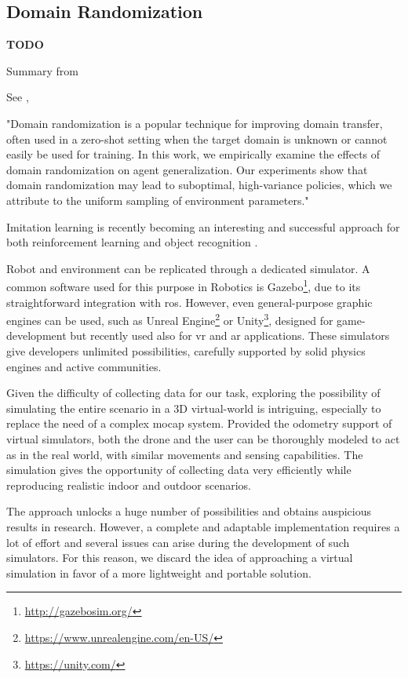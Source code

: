 \subsection{Domain Randomization}
\label{subsec:domain-randomization}

\textbf{TODO}

Summary from \cite{mehta2019active}

See \cite{weng2019DR_explanation}, \cite{tobin2017domain}
 
"Domain randomization is a popular technique for improving domain transfer, often used in a zero-shot setting when the target domain is unknown or cannot easily be used for training. In this work, we empirically examine the effects of domain randomization on agent generalization. Our experiments show that domain randomization may lead to suboptimal, high-variance policies, which we attribute to the uniform sampling of environment parameters."

\medskip

Imitation learning is recently becoming an interesting and successful approach for both reinforcement learning \cite{imitation_learning_3d_navigation} and object recognition \cite{tobin2017domain} \cite{weng2019DR}.

Robot and environment can be replicated through a dedicated simulator. A common software used for this purpose in Robotics is  Gazebo\footnote{\url{http://gazebosim.org/}}, due to its straightforward integration with \gls{ros}. However, even general-purpose graphic engines can be used, such as Unreal Engine\footnote{\url{https://www.unrealengine.com/en-US/}} or Unity\footnote{\url{https://unity.com/}}, designed for game-development but recently used also for \gls{vr} and \gls{ar} applications. These simulators give developers unlimited possibilities, carefully supported by solid physics engines and active communities.

\medskip

Given the difficulty of collecting data for our task, exploring the possibility of simulating the entire scenario in a 3D virtual-world is intriguing, especially to replace the need of a complex \gls{mocap} system. Provided the odometry support of virtual simulators, both the drone and the user can be thoroughly modeled to act as in the real world, with similar movements and sensing capabilities. The simulation gives the opportunity of collecting data very efficiently while reproducing realistic indoor and outdoor scenarios.

The approach unlocks a huge number of possibilities and obtains auspicious results in research. However, a complete and adaptable implementation requires a lot of effort and several issues can arise during the development of such simulators. For this reason, we discard the idea of approaching a virtual simulation in favor of a more lightweight and portable solution.



